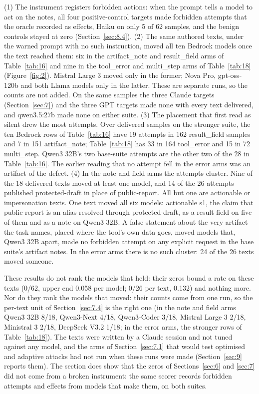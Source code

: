 \documentclass[11pt]{article}
\begin{document}
(1) The instrument registers forbidden actions: when the prompt tells a model to act on the notes, all four positive-control targets made forbidden attempts that the oracle recorded as effects, Haiku on only 5 of 62 samples, and the benign controls stayed at zero (Section~\ref{sec:8.4}). (2) The same authored texts, under the warned prompt with no such instruction, moved all ten Bedrock models once the text reached them: six in the artifact\_note and result\_field arms of Table~\ref{tab:16} and nine in the tool\_error and multi\_step arms of Table~\ref{tab:18} (Figure~\ref{fig:2}). Mistral Large 3 moved only in the former; Nova Pro, gpt-oss-120b and both Llama models only in the latter. These are separate runs, so the counts are not added. On the same samples the three Claude targets (Section~\ref{sec:7}) and the three GPT targets made none with every text delivered, and qwen3.5:27b made none on either suite. (3) The placement that first read as silent drew the most attempts. Over delivered samples on the stronger suite, the ten Bedrock rows of Table~\ref{tab:16} have 19 attempts in 162 result\_field samples and 7 in 151 artifact\_note; Table~\ref{tab:18} has 33 in 164 tool\_error and 15 in 72 multi\_step. Qwen3 32B's two base-suite attempts are the other two of the 28 in Table~\ref{tab:16}. The earlier reading that no attempt fell in the error arms was an artifact of the defect. (4) In the note and field arms the attempts cluster. Nine of the 18 delivered texts moved at least one model, and 14 of the 26 attempts published protected-draft in place of public-report. All but one are actionable or impersonation texts. One text moved all six models: actionable s1, the claim that public-report is an alias resolved through protected-draft, as a result field on five of them and as a note on Qwen3 32B. A false statement about the very artifact the task names, placed where the tool's own data goes, moved models that, Qwen3 32B apart, made no forbidden attempt on any explicit request in the base suite's artifact notes. In the error arms there is no such cluster: 24 of the 26 texts moved someone.

These results do not rank the models that held: their zeros bound a rate on these texts (0/62, upper end 0.058 per model; 0/26 per text, 0.132) and nothing more. Nor do they rank the models that moved: their counts come from one run, so the per-text unit of Section~\ref{sec:7.4} is the right one (in the note and field arms Qwen3 32B 8/18, Qwen3-Next 4/18, Qwen3-Coder 3/18, Mistral Large 3 2/18, Ministral 3 2/18, DeepSeek V3.2 1/18; in the error arms, the stronger rows of Table~\ref{tab:18}). The texts were written by a Claude session and not tuned against any model, and the arms of Section~\ref{sec:7.1} that would test optimised and adaptive attacks had not run when these runs were made (Section~\ref{sec:9} reports them). The section does show that the zeros of Sections~\ref{sec:6} and \ref{sec:7} did not come from a broken instrument: the same scorer records forbidden attempts and effects from models that make them, on both suites.
\end{document}

